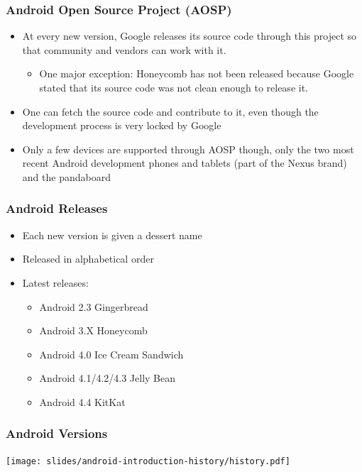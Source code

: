 \begin{frame}
  \frametitle{Android Open Source Project (AOSP)}
  \begin{itemize}
  \item At every new version, Google releases its source code
    through this project so that community and vendors can
    work with it.
    \begin{itemize}
    \item One major exception: Honeycomb has not been released because
      Google stated that its source code was not clean enough to
      release it.
    \end{itemize}
  \item One can fetch the source code and contribute to it, even though
    the development process is very locked by Google
  \item Only a few devices are supported through AOSP though, only the
    two most recent Android development phones and tablets (part of
    the Nexus brand) and the pandaboard
  \end{itemize}
\end{frame}

\begin{frame}
  \frametitle{Android Releases}
  \begin{itemize}
  \item Each new version is given a dessert name
  \item Released in alphabetical order
  \item Latest releases:
    \begin{itemize}
    \item Android 2.3 Gingerbread
    \item Android 3.X Honeycomb
    \item Android 4.0 Ice Cream Sandwich
    \item Android 4.1/4.2/4.3 Jelly Bean
    \item Android 4.4 KitKat
    \end{itemize}
  \end{itemize}
\end{frame}

\begin{frame}
  \frametitle{Android Versions}
  \begin{center}
    \texttt{[image: slides/android-introduction-history/history.pdf]}
  \end{center}
\end{frame}
